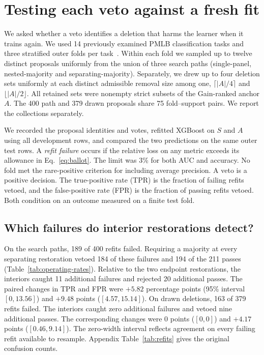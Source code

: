 \section{Testing each veto against a fresh fit}
\label{sec:refit}
We asked whether a veto identifies a deletion that harms the learner when it trains again. We used 14 previously examined PMLB classification tasks and three stratified outer folds per task~\cite{romano2022pmlb}. Within each fold we sampled up to twelve distinct proposals uniformly from the union of three search paths (single-panel, nested-majority and separating-majority). Separately, we drew up to four deletion sets uniformly at each distinct admissible removal size among one, $\lceil |A|/4\rceil$ and $\lfloor |A|/2\rfloor$. All retained sets were nonempty strict subsets of the Gain-ranked anchor $A$. The 400 path and 379 drawn proposals share 75 fold--support pairs. We report the collections separately.

We recorded the proposal identities and votes, refitted XGBoost on $S$ and $A$ using all development rows, and compared the two predictions on the same outer test rows. A \emph{refit failure} occurs if the relative loss on any metric exceeds its allowance in Eq.~\eqref{eq:ballot}. The limit was 3\% for both AUC and accuracy. No fold met the rare-positive criterion for including average precision. A veto is a positive decision. The true-positive rate (TPR) is the fraction of failing refits vetoed, and the false-positive rate (FPR) is the fraction of passing refits vetoed. Both condition on an outcome measured on a finite test fold.

\subsection{Which failures do interior restorations detect?}


On the search paths, 189 of 400 refits failed. Requiring a majority at every separating restoration vetoed 184 of these failures and 194 of the 211 passes (Table~\ref{tab:operating-rates}). Relative to the two endpoint restorations, the interiors caught 11 additional failures and rejected 20 additional passes. The paired changes in TPR and FPR were $+5.82$ percentage points (95\% interval $[0,13.56]$) and $+9.48$ points ($[4.57,15.14]$). On drawn deletions, 163 of 379 refits failed. The interiors caught zero additional failures and vetoed nine additional passes. The corresponding changes were 0 points ($[0,0]$) and $+4.17$ points ($[0.46,9.14]$). The zero-width interval reflects agreement on every failing refit available to resample. Appendix Table~\ref{tab:refits} gives the original confusion counts.

